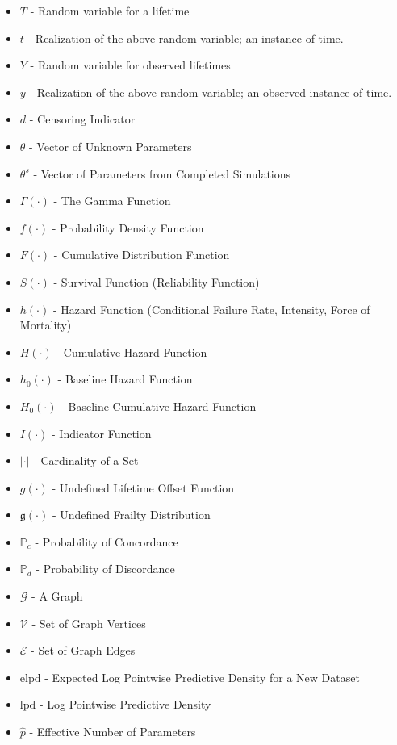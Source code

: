 \begin{itemize}

\item[] $T$ - Random variable for a lifetime
\item[] $t$ - Realization of the above random variable; an instance of time.
\item[] $Y$ - Random variable for observed lifetimes
\item[] $y$ - Realization of the above random variable; an observed instance of time.
\item[] $d$ - Censoring Indicator
\item[] $\theta$ - Vector of Unknown Parameters
\item[] $\theta^s$ - Vector of Parameters from Completed Simulations
\item[] $\Gamma(\cdot)$ - The Gamma Function
\item[] $f(\cdot)$ - Probability Density Function
\item[] $F(\cdot)$ - Cumulative Distribution Function
\item[] $S(\cdot)$ - Survival Function (Reliability Function)
\item[] $h(\cdot)$ - Hazard Function (Conditional Failure Rate, Intensity, Force of Mortality)
\item[] $H(\cdot)$ - Cumulative Hazard Function
\item[] $h_0(\cdot)$ - Baseline Hazard Function
\item[] $H_0(\cdot)$ - Baseline Cumulative Hazard Function
\item[] $I(\cdot)$ - Indicator Function
\item[] $|\cdot|$ - Cardinality of a Set
\item[] $g(\cdot)$ - Undefined Lifetime Offset Function
\item[] $\mathfrak{g}(\cdot)$ - Undefined Frailty Distribution

\item[] $\mathbb{P}_c$ - Probability of Concordance
\item[] $\mathbb{P}_d$ - Probability of Discordance

\item[] $\mathcal{G}$ - A Graph
\item[] $\mathcal{V}$ - Set of Graph Vertices 
\item[] $\mathcal{E}$ - Set of Graph Edges 

\item[] $\text{elpd}$ - Expected Log Pointwise Predictive Density for a New Dataset
\item[] $\text{lpd}$ - Log Pointwise Predictive Density
\item[] $\hat{p}$ - Effective Number of Parameters

\end{itemize}

